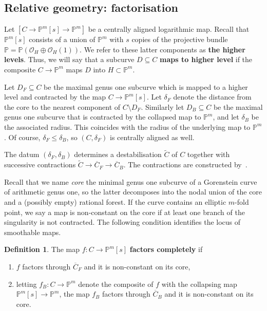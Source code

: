 \documentclass[11pt]{amsart}
\newcommand{\PP}{\mathbb P}
\renewcommand{\to}{\rightarrow}
\theoremstyle{definition}
\theoremstyle{definition}
\newtheorem{definition}[thm]{Definition}
\begin{document}
\subsection{Relative geometry: factorisation}\label{subsection factorisation} Let $[C\to \mathbb P^m[s]\to \mathbb P^m]$ be a centrally aligned logarithmic map. Recall that $\mathbb P^m[s]$ consists of a union of $\mathbb P^m$ with $s$ copies of the projective bundle $\mathbb{P} = \mathbb P(\mathcal O_H\oplus \mathcal O_H(1))$. We refer to these latter components as \textbf{the higher levels}. Thus, we will say that a subcurve $D\subseteq C$ \textbf{maps to higher level} if the composite $C\to \mathbb P^m$ maps $D$ into $H\subset \mathbb P^m$. 

Let $D_F\subseteq C$ be the maximal genus one subcurve which is mapped to a higher level and contracted by the map $C\to \mathbb P^m[s]$. Let $\delta_F$ denote the distance from the core to the nearest component of $C \setminus D_F$. Similarly let $D_B\subseteq C$ be the maximal genus one subcurve that is contracted by the collapsed map to $\mathbb P^m$, and let $\delta_B$ be the associated radius. This coincides with the radius of the underlying map to $\mathbb P^m$. Of course, $\delta_F\leq \delta_B$, so $(C,\delta_F)$ is centrally aligned as well.

The datum $(\delta_F,\delta_B)$ determines a destabilisation $\widetilde C$ of $C$ together with successive contractions $\widetilde C\to \overline C_F\to\overline C_B$. The contractions are constructed by~\cite[Section~3]{RSPW}.

Recall that we name \emph{core} the minimal genus one subcurve of a Gorenstein curve of arithmetic genus one, so the latter decomposes into the nodal union of the core and a (possibly empty) rational forest. If the curve contains an elliptic $m$-fold point, we say a map is non-constant on the core if at least one branch of the singularity is not contracted.
The following condition identifies the locus of smoothable maps. 

\begin{definition}
The map $f\colon C\to \mathbb P^m[s]$ \textbf{factors completely} if 
\begin{enumerate}
\item $f$ factors through $\overline C_F$ and it is non-constant on its core,
\item letting $f_B\colon C\to\PP^m$ denote the composite of $f$ with the collapsing map $\mathbb P^m[s]\to\mathbb P^m$, the map $f_B$ factors through $\overline C_B$ and it is non-constant on its core.
\end{enumerate}
\end{definition}
\end{document}
